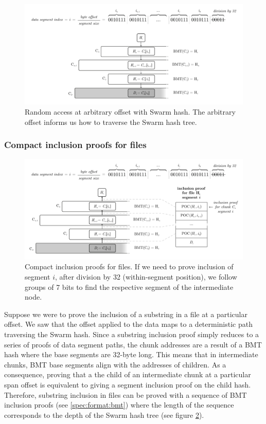\begin{figure}[htbp]
\centering
\includegraphics[width=\textwidth]{fig/random-access.pdf}
\caption[Random access at arbitrary offset with Swarm hash \statusgreen]{Random access at arbitrary offset with Swarm hash. The arbitrary offset informs us how to traverse the Swarm hash tree.}
\label{fig:random-access}
\end{figure}

\subsubsection{Compact inclusion proofs for files}


\begin{figure}[htbp]
\centering
\includegraphics[width=\textwidth]{fig/file-inclusion.pdf}
\caption[Compact inclusion proofs for files \statusgreen]{Compact inclusion proofs for files. If we need to prove inclusion of segment   $i$, after division by 32 (within-segment position), we follow groups of 7 bits to find the respective segment of the intermediate node.}
\label{fig:file-inclusion}
\end{figure}


Suppose we were to prove the inclusion of a substring in a file at a particular offset. We saw that the offset applied to the data maps to a deterministic path traversing the Swarm hash. Since a substring inclusion proof simply reduces to a series of proofs of data segment paths, the chunk addresses are a result of a BMT hash where the base segments are 32-byte long. This means that in intermediate chunks, BMT base segments align with the addresses of children. As a consequence, proving that a the child of an intermediate chunk at a particular span offset is equivalent to giving a segment inclusion proof on the child hash. Therefore, substring inclusion in files can be proved with a sequence of BMT inclusion proofs (see \ref{spec:format:bmt}) where the length of the sequence corresponds to the depth of the Swarm hash tree (see figure \ref{fig:file-inclusion}). 


